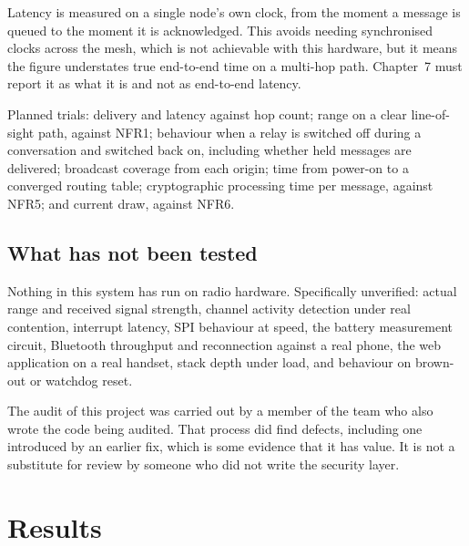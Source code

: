 \documentclass[12pt,a4paper,oneside]{report}
\begin{document}
Latency is measured on a single node's own clock, from the moment a message is
queued to the moment it is acknowledged. This avoids needing synchronised clocks
across the mesh, which is not achievable with this hardware, but it means the
figure understates true end-to-end time on a multi-hop path. Chapter~7 must
report it as what it is and not as end-to-end latency.

Planned trials: delivery and latency against hop count; range on a clear
line-of-sight path, against NFR1; behaviour when a relay is switched off during a
conversation and switched back on, including whether held messages are delivered;
broadcast coverage from each origin; time from power-on to a converged routing
table; cryptographic processing time per message, against NFR5; and current draw,
against NFR6.

\section{What has not been tested}

Nothing in this system has run on radio hardware. Specifically unverified: actual
range and received signal strength, channel activity detection under real
contention, interrupt latency, SPI behaviour at speed, the battery measurement
circuit, Bluetooth throughput and reconnection against a real phone, the web
application on a real handset, stack depth under load, and behaviour on brown-out
or watchdog reset.

The audit of this project was carried out by a member of the team who also wrote
the code being audited. That process did find defects, including one introduced
by an earlier fix, which is some evidence that it has value. It is not a
substitute for review by someone who did not write the security layer.

\chapter{Results}

%
%
\end{document}
